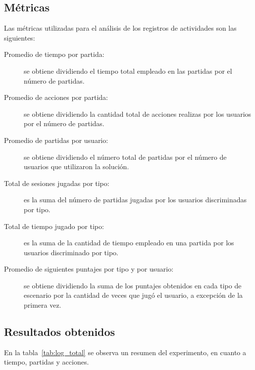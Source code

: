 \subsection{Métricas}

Las métricas utilizadas para el análisis de los registros de actividades son las siguientes:

\begin{description}
\item[Promedio de tiempo por partida:] se obtiene dividiendo el tiempo total empleado 
    en las partidas por el número de partidas.
\item[Promedio de acciones por partida:] se obtiene dividiendo la cantidad total de 
    acciones realizas por los usuarios por el número de partidas.
\item[Promedio de partidas por usuario:] se obtiene dividiendo el número total de partidas
    por el número de usuarios que utilizaron la solución.
\item[Total de sesiones jugadas por tipo:] es la suma del número de partidas jugadas por los 
    usuarios discriminadas por tipo.
\item[Total de tiempo jugado por tipo:] es la suma de la cantidad de tiempo empleado en una 
    partida por los usuarios discriminado por tipo.
\item[Promedio de siguientes puntajes por tipo y por usuario:] se obtiene dividiendo la suma 
    de los puntajes obtenidos en cada tipo de escenario por la cantidad de veces que jugó el 
    usuario, a excepción de la primera vez.
\end{description}


\subsection{Resultados obtenidos}


En la tabla~\ref{tab:log_total} se observa un resumen del experimento, en cuanto a tiempo, partidas y acciones.


